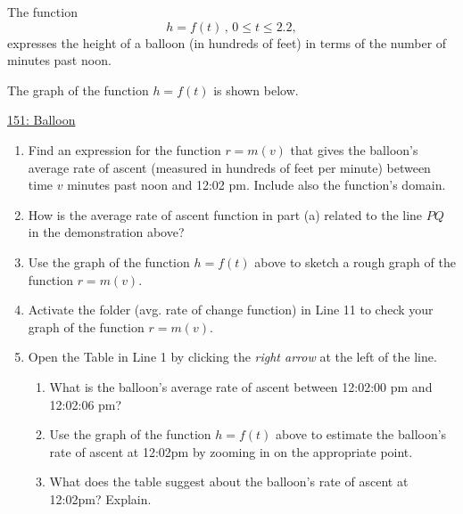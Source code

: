 \documentclass{ximera}
\begin{document}
\begin{question}  \label{Q4ghg5t4t4tr4}
The function
\[
      h = f(t)  \, , \, 0\leq t \leq 2.2 ,                     %
\]
expresses the height of a balloon (in hundreds of feet) in terms of the number of minutes past noon.

The graph of the function $h=f(t)$ is shown below.

\begin{onlineOnly}
    \begin{center}
\end{center}
\end{onlineOnly}

\href{https://www.desmos.com/calculator/yd4xm6x6ub}{151: Balloon}

\begin{enumerate}

\item Find an expression for the function $r=m(v)$ that gives the balloon's average rate of ascent (measured in hundreds of feet per minute) between time $v$ minutes past noon and 12:02 pm. Include also the function's domain.

\item How is the average rate of ascent function in part (a) related to the line $PQ$ in the demonstration above?

\item Use the graph of the function $h=f(t)$ above to sketch a rough graph of the function $r=m(v)$.

\item Activate the folder (avg. rate of change function) in Line 11 to check your graph of the function $r=m(v)$. 

\item Open the Table in Line 1 by clicking the \emph{right arrow} at the left of the line. 

\begin{enumerate}
\item What is the balloon's average rate of ascent between 12:02:00 pm and 12:02:06 pm?

\item Use the graph of the function $h=f(t)$ above to estimate the balloon's rate of ascent at 12:02pm by zooming in on the appropriate point.

\item What does the table suggest about the balloon's rate of ascent at 12:02pm? Explain.
\end{enumerate}


\end{enumerate}
\end{question}
\end{document}
